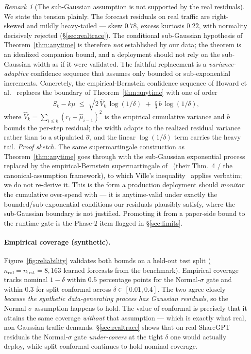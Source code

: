 \documentclass[11pt]{article}
\theoremstyle{plain}
\theoremstyle{definition}
\theoremstyle{remark}
\newtheorem{remark}{Remark}
\begin{document}
\begin{remark}[The sub-Gaussian assumption is not supported by the real residuals]\label{rem:subgauss}
We state the tension plainly. The forecast residuals on real traffic are right-skewed and mildly heavy-tailed --- skew $0.78$, excess kurtosis $0.22$, with normality decisively rejected (\S\ref{sec:realtrace}). The conditional sub-Gaussian hypothesis of Theorem~\ref{thm:anytime} is therefore \emph{not} established by our data; the theorem is an idealized companion bound, and a deployment should not rely on the sub-Gaussian width as if it were validated. The faithful replacement is a \emph{variance-adaptive} confidence sequence that assumes only bounded or sub-exponential increments. Concretely, the empirical-Bernstein confidence sequence of Howard et al.~\cite{howard2021} replaces the boundary of Theorem~\ref{thm:anytime} with one of order
\[
S_k-k\mu \;\le\; \sqrt{2\,\widehat V_k\,\log(1/\delta)} \;+\; \tfrac{c}{3}\,b\,\log(1/\delta),
\]
where $\widehat V_k=\sum_{i\le k}(r_i-\hat\mu_{i-1})^2$ is the empirical cumulative variance and $b$ bounds the per-step residual; the width adapts to the realized residual variance rather than to a stipulated $\hat\sigma$, and the linear $\log(1/\delta)$ term carries the heavy tail. \emph{Proof sketch.} The same supermartingale construction as Theorem~\ref{thm:anytime} goes through with the sub-Gaussian exponential process replaced by the empirical-Bernstein supermartingale of~\cite{howard2021} (their Thm.~4 / the canonical-assumption framework), to which Ville's inequality~\cite{ramdas2023} applies verbatim; we do not re-derive it. This is the form a production deployment should \emph{monitor} the cumulative over-spend with --- it is anytime-valid under exactly the bounded/sub-exponential conditions our residuals plausibly satisfy, where the sub-Gaussian boundary is not justified. Promoting it from a paper-side bound to the runtime gate is the Phase-2 item flagged in \S\ref{sec:limits}.
\end{remark}

\paragraph{Empirical coverage (synthetic).} Figure~\ref{fig:reliability} validates both bounds on a held-out test split ($n_{\mathrm{cal}}=n_{\mathrm{test}}=8{,}163$ learned forecasts from the benchmark). Empirical coverage tracks nominal $1-\delta$ within $0.5$ percentage points for the Normal-$\sigma$ gate and within $0.3$ for split conformal across $\delta \in [0.01, 0.4]$. The two agree closely \emph{because the synthetic data-generating process has Gaussian residuals}, so the Normal-$\sigma$ assumption happens to hold. The value of conformal is precisely that it attains the same coverage \emph{without} that assumption --- which is exactly what real, non-Gaussian traffic demands. \S\ref{sec:realtrace} shows that on real ShareGPT residuals the Normal-$\sigma$ gate \emph{under-covers} at the tight $\delta$ one would actually deploy, while split conformal continues to hold nominal coverage.
\end{document}

